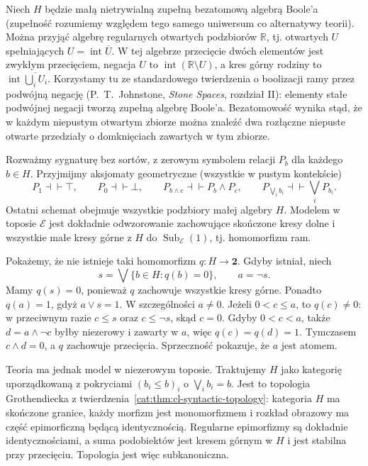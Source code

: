 \begin{przyklad}\label{cat:ex:cl-pointless-theory}
Niech $H$ będzie małą nietrywialną zupełną bezatomową algebrą Boole'a (zupełność rozumiemy względem tego samego uniwersum co alternatywy teorii). Można przyjąć algebrę regularnych otwartych podzbiorów $\mathbb R$, tj. otwartych $U$ spełniających $U=\operatorname{int}\overline U$. W tej algebrze przecięcie dwóch elementów jest zwykłym przecięciem, negacja $U$ to $\operatorname{int}(\mathbb R\setminus U)$, a kres górny rodziny to $\operatorname{int}\overline{\bigcup_iU_i}$. Korzystamy tu ze standardowego twierdzenia o boolizacji ramy przez podwójną negację (P.~T.~Johnstone, \emph{Stone Spaces}, rozdział II): elementy stałe podwójnej negacji tworzą zupełną algebrę Boole'a. Bezatomowość wynika stąd, że w każdym niepustym otwartym zbiorze można znaleźć dwa rozłączne niepuste otwarte przedziały o domknięciach zawartych w tym zbiorze.

Rozważmy sygnaturę bez sortów, z zerowym symbolem relacji $P_b$ dla każdego $b\in H$. Przyjmijmy aksjomaty geometryczne (wszystkie w pustym kontekście)
\[
 P_1\dashv\vdash\top,\qquad P_0\dashv\vdash\bot,\qquad
 P_{b\wedge c}\dashv\vdash P_b\wedge P_c,\qquad
 P_{\bigvee_i b_i}\dashv\vdash\bigvee_iP_{b_i}.
\]
Ostatni schemat obejmuje wszystkie podzbiory małej algebry $H$. Modelem w toposie $\mathcal E$ jest dokładnie odwzorowanie zachowujące skończone kresy dolne i wszystkie małe kresy górne z $H$ do $\operatorname{Sub}_{\mathcal E}(1)$, tj. homomorfizm ram.

Pokażemy, że nie istnieje taki homomorfizm $q:H\to\mathbf 2$. Gdyby istniał, niech
\[
 s=\bigvee\{b\in H:q(b)=0\},\qquad a=\neg s.
\]
Mamy $q(s)=0$, ponieważ $q$ zachowuje wszystkie kresy górne. Ponadto $q(a)=1$, gdyż $a\vee s=1$. W szczególności $a\neq0$. Jeżeli $0<c\leq a$, to $q(c)\neq0$: w przeciwnym razie $c\leq s$ oraz $c\leq\neg s$, skąd $c=0$. Gdyby $0<c<a$, także $d=a\wedge\neg c$ byłby niezerowy i zawarty w $a$, więc $q(c)=q(d)=1$. Tymczasem $c\wedge d=0$, a $q$ zachowuje przecięcia. Sprzeczność pokazuje, że $a$ jest atomem.

Teoria ma jednak model w niezerowym toposie. Traktujemy $H$ jako kategorię uporządkowaną z pokryciami $(b_i\leq b)_i$ o $\bigvee_i b_i=b$. Jest to topologia Grothendiecka z twierdzenia~\ref{cat:thm:cl-syntactic-topology}: kategoria $H$ ma skończone granice, każdy morfizm jest monomorfizmem i rozkład obrazowy ma część epimorficzną będącą identycznością. Regularne epimorfizmy są dokładnie identycznościami, a suma podobiektów jest kresem górnym w $H$ i jest stabilna przy przecięciu. Topologia jest więc subkanoniczna.


\end{przyklad}
